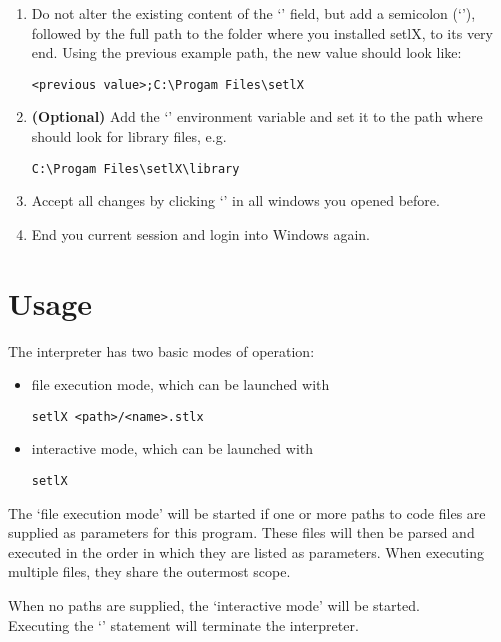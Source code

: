 \begin{enumerate}
\begin{enumerate}
		\item Do not alter the existing content of the `' field, but add a semicolon (`\command{;}'), followed by the full path to the folder where you installed setlX, to its very end. Using the previous example path, the new value should look like:
\begin{lstlisting}[frame=none,numbers=none]
<previous value>;C:\Progam Files\setlX
\end{lstlisting}
		\item \textbf{(Optional)} Add the `' environment variable and set it to the path where \setlX{} should look for library files, e.g.
\begin{lstlisting}[frame=none,numbers=none]
C:\Progam Files\setlX\library
\end{lstlisting}
		\item Accept all changes by clicking `' in all windows you opened before.
		\item End you current session and login into Windows again.
	\end{enumerate}
\end{enumerate}

\newpage

\section{Usage}

The \setlX{} interpreter has two basic modes of operation:

\begin{itemize}
	\item file execution mode, which can be launched with
\begin{lstlisting}[frame=none,numbers=none]
setlX <path>/<name>.stlx
\end{lstlisting}
	\item interactive mode, which can be launched with
\begin{lstlisting}[frame=none,numbers=none]
setlX
\end{lstlisting}
\end{itemize}

The `file execution mode' will be started if one or more paths to code files are supplied as parameters for this program. These files will then be parsed and executed in the order in which they are listed as parameters. When executing multiple files, they share the outermost scope.

When no paths are supplied, the `interactive mode' will be started.\\
Executing the `' statement will terminate the interpreter.

